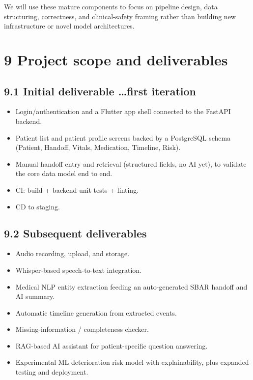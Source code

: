 \documentclass[
]{article}
\begin{document}
We will use these mature components to focus on pipeline design, data
structuring, correctness, and clinical-safety framing rather than
building new infrastructure or novel model architectures.

\section{9 Project scope and
deliverables}\label{project-scope-and-deliverables}

\subsection{9.1 Initial deliverable \ldots first
iteration}\label{initial-deliverable-first-iteration}

\begin{itemize}
\item
  Login/authentication and a Flutter app shell connected to the FastAPI
  backend.
\item
  Patient list and patient profile screens backed by a PostgreSQL schema
  (Patient, Handoff, Vitals, Medication, Timeline, Risk).
\item
  Manual handoff entry and retrieval (structured fields, no AI yet), to
  validate the core data model end to end.
\item
  CI: build + backend unit tests + linting.
\item
  CD to staging.
\end{itemize}

\subsection{9.2 Subsequent deliverables}\label{subsequent-deliverables}

\begin{itemize}
\item
  Audio recording, upload, and storage.
\item
  Whisper-based speech-to-text integration.
\item
  Medical NLP entity extraction feeding an auto-generated SBAR handoff
  and AI summary.
\item
  Automatic timeline generation from extracted events.
\item
  Missing-information / completeness checker.
\item
  RAG-based AI assistant for patient-specific question answering.
\item
  Experimental ML deterioration risk model with explainability, plus
  expanded testing and deployment.
\end{itemize}
\end{document}
